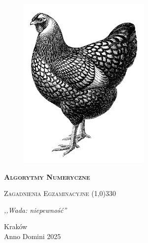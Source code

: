 \begin{titlepage} 
    \begin{center}
         \begin{figure}[h]
            \centering
            \includegraphics[]{img/kura.png}
           
        \end{figure}
        
        \Huge
        \textbf{\textsc{Algorytmy Numeryczne}}
        
        \vspace{0.5cm}
        \Large
        \textsc{Zagadnienia Egzaminacyjne}
        \line(1,0){330}
        
        \normalsize
        
        \vspace{1cm}
        \textit{,,Wada: niepewność''}
        \vspace{1cm}

  
 
        \vfill

        Kraków \\
        Anno Domini 2025
    \end{center}
\end{titlepage}
